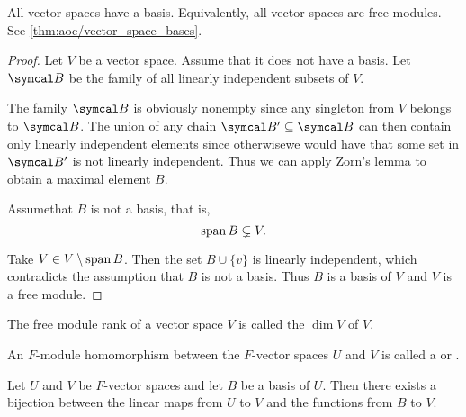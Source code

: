 \begin{theorem}\label{thm:all_vector_spaces_are_free_modules}
  All vector spaces have a basis. Equivalently, all vector spaces are free modules. See \cref{thm:aoc/vector_space_bases}.
\end{theorem}
\begin{proof}
  Let \( V \) be a vector space. Assume that it does not have a basis. Let \( \Cal{B} \) be the family of all linearly independent subsets of \( V \).

  The family \( \Cal{B} \) is obviously nonempty since any singleton from \( V \) belongs to \( \Cal{B} \). The union of any chain \( \Cal{B}' \subseteq \Cal{B} \) can then contain only linearly independent elements since otherwise\LEM we would have that some set in \( \Cal{B}' \) is not linearly independent. Thus we can apply Zorn's lemma to obtain a maximal element \( B \).

  Assume\LEM that \( B \) is not a basis, that is,
  \begin{equation*}
    \operatorname{span} B \subsetneq V.
  \end{equation*}

  Take \( V \in V \setminus \operatorname{span} B \). Then the set \( B \cup \{ v \} \) is linearly independent, which contradicts the assumption that \( B \) is not a basis. Thus \( B \) is a basis of \( V \) and \( V \) is a free module.
\end{proof}

\begin{definition}\label{def:vector_space_dimension}
  The free module rank of a vector space \( V \) is called the  \( \dim V \) of \( V \).
\end{definition}

\begin{definition}\label{def:linear_operator}
  An \( F \)-module homomorphism between the \( F \)-vector spaces \( U \) and \( V \) is called a  or .
\end{definition}

\begin{proposition}\label{thm:linear_operator_iff_function_on_basis}
  Let \( U \) and \( V \) be \( F \)-vector spaces and let \( B \) be a basis of \( U \). Then there exists a bijection between the linear maps from \( U \) to \( V \) and the functions from \( B \) to \( V \).
\end{proposition}
